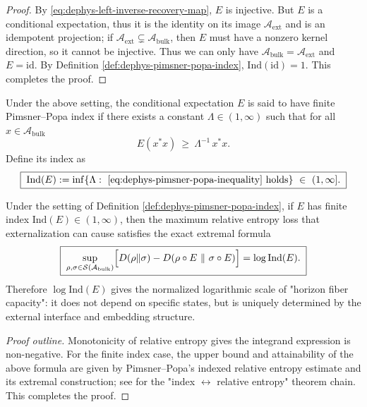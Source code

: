 \begin{proof}
By \eqref{eq:dephys-left-inverse-recovery-map}, \(E\) is injective.
But \(E\) is a conditional expectation, thus it is the identity on its image \(\mathcal{A}_{\mathrm{ext}}\) and is an idempotent projection; if \(\mathcal{A}_{\mathrm{ext}}\subsetneq \mathcal{A}_{\mathrm{bulk}}\), then \(E\) must have a nonzero kernel direction, so it cannot be injective.
Thus we can only have \(\mathcal{A}_{\mathrm{bulk}}=\mathcal{A}_{\mathrm{ext}}\) and \(E=\mathrm{id}\).
By Definition \ref{def:dephys-pimsner-popa-index}, \(\mathrm{Ind}(\mathrm{id})=1\). This completes the proof.
\end{proof}

\begin{definition}\label{def:dephys-pimsner-popa-index}
Under the above setting, the conditional expectation \(E\) is said to have finite Pimsner--Popa index if there exists a constant \(\Lambda\in(1,\infty)\) such that for all \(x\in\mathcal{A}_{\mathrm{bulk}}\)
\begin{equation}\label{eq:dephys-pimsner-popa-inequality}
\boxed{\;
E(x^\ast x)\ \ge\ \Lambda^{-1}\,x^\ast x.\;}
\end{equation}
Define its index as
\[
\boxed{\;
\mathrm{Ind}(E):=\inf\{\Lambda:\ \eqref{eq:dephys-pimsner-popa-inequality}\ \text{holds}\}\ \in\ (1,\infty].\;}
\]
\end{definition}

\begin{theorem}\label{thm:dephys-index-max-relative-entropy-loss}
Under the setting of Definition \ref{def:dephys-pimsner-popa-index}, if \(E\) has finite index \(\mathrm{Ind}(E)\in(1,\infty)\),
then the maximum relative entropy loss that externalization can cause satisfies the exact extremal formula
\begin{equation}\label{eq:dephys-index-max-entropy-loss}
\boxed{\;
\sup_{\rho,\sigma\in\mathcal{S}(\mathcal{A}_{\mathrm{bulk}})}
\Bigl[D(\rho\|\sigma)-D(\rho\circ E\ \|\ \sigma\circ E)\Bigr]
=\log \mathrm{Ind}(E).\;}
\end{equation}
Therefore \(\log\mathrm{Ind}(E)\) gives the normalized logarithmic scale of "horizon fiber capacity": it does not depend on specific states, but is uniquely determined by the external interface and embedding structure.
\end{theorem}

\begin{proof}[Proof outline]
Monotonicity of relative entropy gives the integrand expression is non-negative.
For the finite index case, the upper bound and attainability of the above formula are given by Pimsner--Popa's indexed relative entropy estimate and its extremal construction;
see \cite{PimsnerPopa1986EntropyIndexSubfactors,Hiai1991MinimumIndexSubfactorsEntropyII} for the "index \(\leftrightarrow\) relative entropy" theorem chain. This completes the proof.
\end{proof}

